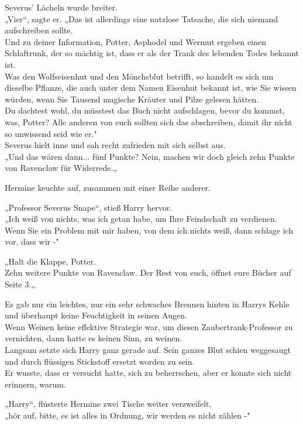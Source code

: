 {Severus' Lächeln wurde breiter.\\ „Vier“, sagte er. „Das ist allerdings eine nutzlose Tatsache, die sich niemand aufschreiben sollte.\\ Und zu deiner Information, Potter, Asphodel und Wermut ergeben einen Schlaftrunk, der so mächtig ist, dass er als der Trank des lebenden Todes bekannt ist.\\ Was den Wolfseisenhut und den Mönchsblut betrifft, so handelt es sich um dieselbe Pflanze, die auch unter dem Namen Eisenhut bekannt ist, wie Sie wissen würden, wenn Sie Tausend magische Kräuter und Pilze gelesen hätten.\\ Du dachtest wohl, du müsstest das Buch nicht aufschlagen, bevor du kommst, was, Potter? Alle anderen von euch sollten sich das abschreiben, damit ihr nicht so unwissend seid wie er."\\ Severus hielt inne und sah recht zufrieden mit sich selbst aus.\\ „Und das wären dann... fünf Punkte? Nein, machen wir doch gleich zehn Punkte von Ravenclaw für Widerrede.„

Hermine keuchte auf, zusammen mit einer Reihe anderer.

„Professor Severus Snape“, stieß Harry hervor.\\ „Ich weiß von nichts, was ich getan habe, um Ihre Feindschaft zu verdienen.\\ Wenn Sie ein Problem mit mir haben, von dem ich nichts weiß, dann schlage ich vor, dass wir -"

„Halt die Klappe, Potter.\\ Zehn weitere Punkte von Ravenclaw. Der Rest von euch, öffnet eure Bücher auf Seite 3.„

Es gab nur ein leichtes, nur ein sehr schwaches Brennen hinten in Harrys Kehle und überhaupt keine Feuchtigkeit in seinen Augen.\\ Wenn Weinen keine effektive Strategie war, um diesen Zaubertrank-Professor zu vernichten, dann hatte es keinen Sinn, zu weinen.\\ Langsam setzte sich Harry ganz gerade auf. Sein ganzes Blut schien weggesaugt und durch flüssigen Stickstoff ersetzt worden zu sein.\\ Er wusste, dass er versucht hatte, sich zu beherrschen, aber er konnte sich nicht erinnern, warum.

„Harry“, flüsterte Hermine zwei Tische weiter verzweifelt,\\ „hör auf, bitte, es ist alles in Ordnung, wir werden es nicht zählen -"

}
